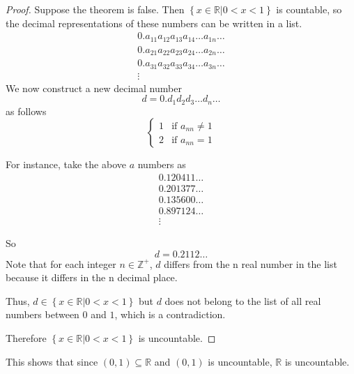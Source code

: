 \begin{proof}
    Suppose the theorem is false.
    Then $\left\{x\in\mathbb R | 0 < x < 1\right\}$ is countable, so the decimal representations of these numbers can be written in a list.
    \begin{equation*}
            \begin{array}{c}
                0.a_{11}a_{12}a_{13}a_{14}\dots a_{1n}\dots \\
                0.a_{21}a_{22}a_{23}a_{24}\dots a_{2n}\dots \\
                0.a_{31}a_{32}a_{33}a_{34}\dots a_{3n}\dots \\
                \vdots
            \end{array}
    \end{equation*}
    We now construct a new decimal number $$d = 0.d_1d_2d_3\dots d_n \dots$$ as follows \begin{equation*}
    \left\{\begin{array}{ll}
        1 & \text{if $a_{nn} \neq 1$} \\
        2 & \text{if $a_{nn} = 1$}
\end{array}\right.
    \end{equation*}

    For instance, take the above $a$ numbers as
    \begin{equation*}
            \begin{array}{c}
                0.120411\dots \\
                0.201377\dots \\
                0.135600\dots \\
                0.897124\dots \\
                \vdots
            \end{array}
    \end{equation*}

    So $$d = 0.2112\dots$$ Note that for each integer $n\in\mathbb Z^+$, $d$ differs from the n real number in the list because it differs in the n decimal place.

    Thus, $d\in\left\{x\in\mathbb R | 0 < x < 1\right\}$ but $d$ does not belong to the list of all real numbers between $0$ and $1$, which is a contradiction.

    Therefore $\left\{x\in\mathbb R | 0 < x < 1\right\}$ is uncountable.
\end{proof}

This shows that since $\left(0,1\right)\subseteq \mathbb R$ and $\left(0,1\right)$ is uncountable, $\mathbb R$ is uncountable.


